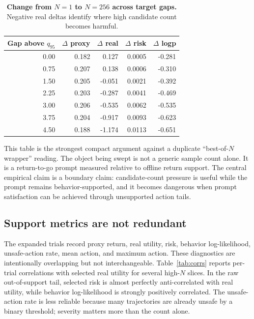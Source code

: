 \begin{table}[t]
\centering
\small
\caption{\textbf{Change from $N=1$ to $N=256$ across target gaps.} Negative real deltas identify where high candidate count becomes harmful.}
\label{tab:gap-deltas}
\begin{tabular}{rrrrr}
\toprule
Gap above $q_{95}$ & $\Delta$ proxy & $\Delta$ real & $\Delta$ risk & $\Delta$ logp \\
\midrule
0.00 & 0.182 & 0.127 & 0.0005 & -0.281 \\
0.75 & 0.207 & 0.138 & 0.0006 & -0.310 \\
1.50 & 0.205 & -0.051 & 0.0021 & -0.392 \\
2.25 & 0.203 & -0.287 & 0.0041 & -0.469 \\
3.00 & 0.206 & -0.535 & 0.0062 & -0.535 \\
3.75 & 0.204 & -0.917 & 0.0093 & -0.623 \\
4.50 & 0.188 & -1.174 & 0.0113 & -0.651 \\
\bottomrule
\end{tabular}
\end{table}

This table is the strongest compact argument against a duplicate ``best-of-$N$ wrapper'' reading. The object being swept is not a generic sample count alone. It is a return-to-go prompt measured relative to offline return support. The central empirical claim is a boundary claim: candidate-count pressure is useful while the prompt remains behavior-supported, and it becomes dangerous when prompt satisfaction can be achieved through unsupported action tails.

\subsection{Support metrics are not redundant}

The expanded trials record proxy return, real utility, risk, behavior log-likelihood, unsafe-action rate, mean action, and maximum action. These diagnostics are intentionally overlapping but not interchangeable. Table~\ref{tab:corrs} reports per-trial correlations with selected real utility for several high-$N$ slices. In the raw out-of-support tail, selected risk is almost perfectly anti-correlated with real utility, while behavior log-likelihood is strongly positively correlated. The unsafe-action rate is less reliable because many trajectories are already unsafe by a binary threshold; severity matters more than the count alone.

